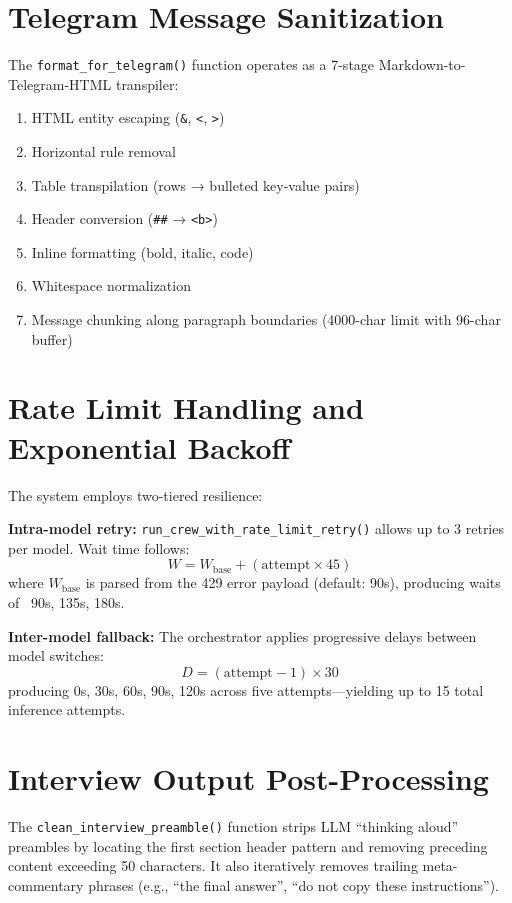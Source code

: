 \documentclass[12pt,a4paper]{report}
\begin{document}
\section{Telegram Message Sanitization}
The \texttt{format\_for\_telegram()} function operates as a 7-stage Markdown-to-Telegram-HTML transpiler:
\begin{enumerate}
    \item HTML entity escaping (\texttt{\&}, \texttt{<}, \texttt{>})
    \item Horizontal rule removal
    \item Table transpilation (rows → bulleted key-value pairs)
    \item Header conversion (\texttt{\#\#} → \texttt{<b>})
    \item Inline formatting (bold, italic, code)
    \item Whitespace normalization
    \item Message chunking along paragraph boundaries (4000-char limit with 96-char buffer)
\end{enumerate}

\section{Rate Limit Handling and Exponential Backoff}
The system employs two-tiered resilience:

\textbf{Intra-model retry:} \texttt{run\_crew\_with\_rate\_limit\_retry()} allows up to 3 retries per model. Wait time follows:
\begin{equation}
W = W_{\text{base}} + (\text{attempt} \times 45)
\end{equation}
where $W_{\text{base}}$ is parsed from the 429 error payload (default: 90s), producing waits of ~90s, 135s, 180s.

\textbf{Inter-model fallback:} The orchestrator applies progressive delays between model switches:
\begin{equation}
D = (\text{attempt} - 1) \times 30
\end{equation}
producing 0s, 30s, 60s, 90s, 120s across five attempts---yielding up to 15 total inference attempts.

\section{Interview Output Post-Processing}
The \texttt{clean\_interview\_preamble()} function strips LLM ``thinking aloud'' preambles by locating the first section header pattern and removing preceding content exceeding 50 characters. It also iteratively removes trailing meta-commentary phrases (e.g., ``the final answer'', ``do not copy these instructions'').
\end{document}

